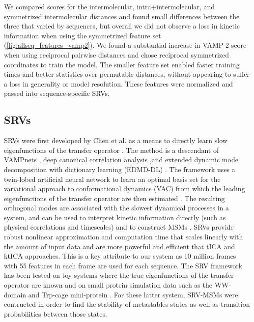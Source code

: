 \documentclass[journal=jpcbfk,manuscript=article]{achemso}
\begin{document}
We compared scores for the intermolecular, intra+intermolecular,  and symmetrized intermolecular distances and found small differences between the three that varied by sequences, but overall we did not observe a loss in kinetic information when using the symmetrized feature set (\ref{fig:allseq_features_vamp2}). We found a substantial increase in VAMP-2 score when using reciprocal pairwise distances and chose reciprocal symmetrized coordinates to train the model. The smaller feature set enabled faster training times and better statistics over permutable distances, without appearing to suffer a loss in generality or model resolution. These features were normalized and passed into sequence-specific SRVs. 

\subsection{\label{sec:methods}SRVs}
 
SRVs were first developed by Chen et al. as a means to directly learn slow eigenfunctions of the transfer operator \citep{Chen}. The method is a descendant of VAMPnets \citep{Mardt2018VAMPnetsKinetics}, deep canonical correlation analysis \citep{Andrew2013DeepAnalysis},and extended dynamic mode decomposition with dictionary learning (EDMD-DL) \citep{Li2017ExtendedOperator}. The framework uses a twin-lobed artificial neural network to learn an optimal basis set for the variational approach to conformational dynamics (VAC) from which the leading eigenfunctions of the transfer operator are then estimated \citep{Noe2013ASystems}. The resulting orthogonal modes are associated with the slowest dynamical processes in a system, and can be used to interpret kinetic information directly (such as physical correlations and timescales) and to construct MSMs \citep{Sidky, Pande2010EverythingAsk}. SRVs provide robust nonlinear approximation and computation time that scales linearly with the amount of input data and are more powerful and efficient that tICA and ktICA approaches. This is a key attribute to our system as 10 million frames with 55 features in each frame are used for each sequence. The SRV framework has been tested on toy systems where the true eigenfunctions of the transfer operator are known and on small protein simulation data such as the WW-domain and Trp-cage mini-protein \citep{Chen, Sidky}. For these latter system, SRV-MSMs were contructed in order to find the stability of metastables states as well as transition probabilities between those states.
\end{document}

